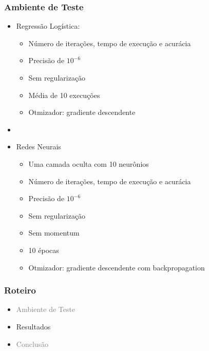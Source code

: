 \documentclass[10pt]{beamer}
\begin{document}
\begin{frame}[fragile]
  \frametitle{Ambiente de Teste}

  \begin{itemize}
    \item Regressão Logística:
    \begin{itemize}
      \item[-] Número de iterações, tempo de execução e acurácia
      \item[-] Precisão de $10^{-6}$
      \item[-] Sem regularização
      \item[-] Média de 10 execuções
      \item[-] Otmizador: gradiente descendente
    \end{itemize}

    \item[\ ] \ 
  \end{itemize}


  \begin{itemize}
    \item Redes Neurais
    \begin{itemize}
      \item[-] Uma camada oculta com 10 neurônios
      \item[-] Número de iterações, tempo de execução e acurácia
      \item[-] Precisão de $10^{-6}$
      \item[-] Sem regularização
      \item[-] Sem momentum
      \item[-] 10 épocas
      \item[-] Otmizador: gradiente descendente com backpropagation
    \end{itemize}
  \end{itemize}



\end{frame}


\begin{frame}
  \frametitle{Roteiro}

  \begin{itemize}

    \item[\color{gray}{$\bullet$}] \textcolor{gray}{Ambiente de Teste}

    \item Resultados

    \item[\color{gray}{$\bullet$}] \textcolor{gray}{Conclusão}

  \end{itemize}

\end{frame}
\end{document}
